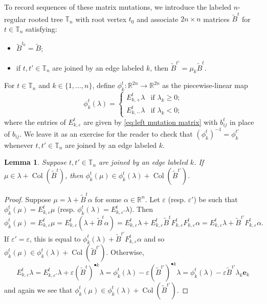 \documentclass{amsart}
\newtheorem{lemma}[theorem]{Lemma}
\numberwithin{theorem}{section}
\newcommand{\RR}{\mathbb{R}}
\newcommand{\TT}{\mathbb{T}}
\newcommand{\Col}{\operatorname{Col}}
\begin{document}
  To record sequences of these matrix mutations, we introduce the labeled $n$-regular rooted tree $\TT_n$ with root vertex $t_0$ and associate $2n\times n$ matrices $\tilde{B}^t$ for $t\in\TT_n$ satisfying:
  \begin{itemize}
    \item $\tilde{B}^{t_0}=\tilde{B}$;
    \item if $t,t'\in\TT_n$ are joined by an edge labeled $k$, then $\tilde{B}^{t'}=\mu_k \tilde{B}^t$.
  \end{itemize}

  For $t\in\TT_n$ and $k\in\{1,\ldots,n\}$, define $\phi^t_k:\RR^{2n}\to\RR^{2n}$ as the piecewise-linear map
  \[
    \phi^t_k(\lambda)=\begin{cases} E^t_{k,+}\lambda & \text{if $\lambda_k\ge0$;}\\ E^t_{k,-}\lambda & \text{if $\lambda_k<0$;} \end{cases}
  \]
  where the entries of $E^t_{k,\varepsilon}$ are given by \eqref{eq:left mutation matrix} with $b^t_{ij}$ in place of $b_{ij}$.
  We leave it as an exercise for the reader to check that $(\phi^t_k)^{-1}=\phi^{t'}_k$ whenever $t,t'\in\TT_n$ are joined by an edge labeled $k$.
  \begin{lemma}
    Suppose $t,t'\in\TT_n$ are joined by an edge labeled $k$.
    If $\mu\in\lambda+\Col(\tilde{B}^t)$, then $\phi^t_k(\mu)\in\phi^t_k(\lambda)+\Col(\tilde{B}^{t'})$.
  \end{lemma}
  \begin{proof}
    Suppose $\mu=\lambda+\tilde{B}^t\alpha$ for some $\alpha\in\RR^n$.
    Let $\varepsilon$ (resp. $\varepsilon'$) be such that $\phi^t_k(\mu)=E^t_{k,\varepsilon}\mu$ (resp. $\phi^t_k(\lambda)=E^t_{k,\varepsilon'}\lambda$).
    Then 
    \[
      \phi^t_k(\mu)=E^t_{k,\varepsilon}\mu=E^t_{k,\varepsilon}(\lambda+\tilde{B}^t\alpha)=E^t_{k,\varepsilon}\lambda + E^t_{k,\varepsilon} \tilde{B}^t F^t_{k,\varepsilon} F^t_{k,\varepsilon}\alpha=E^t_{k,\varepsilon}\lambda + \tilde{B}^{t'} F^t_{k,\varepsilon}\alpha.
    \]
    If $\varepsilon'=\varepsilon$, this is equal to $\phi^t_k(\lambda) + \tilde{B}^{t'} F^t_{k,\varepsilon}\alpha$ and so $\phi^t_k(\mu)\in\phi^t_k(\lambda)+\Col(\tilde{B}^{t'})$.
    Otherwise, 
    \[
      E^t_{k,\varepsilon}\lambda=E^t_{k,\varepsilon'}\lambda+\varepsilon(\tilde{B}^t)^{\bullet k}\lambda=\phi^t_k(\lambda)-\varepsilon(\tilde{B}^{t'})^{\bullet k}\lambda=\phi^t_k(\lambda)-\varepsilon \tilde{B}^{t'} \lambda_k \mathbf{e}_k
    \]
    and again we see that $\phi^t_k(\mu)\in\phi^t_k(\lambda)+\Col(\tilde{B}^{t'})$.
  \end{proof}
\end{document}
